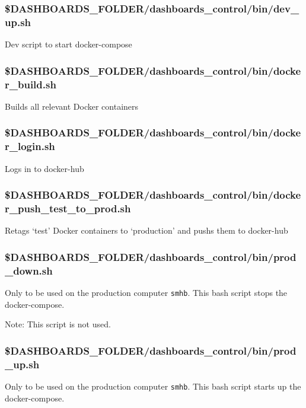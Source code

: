 \documentclass[12pt,]{article}
\begin{document}
\subsubsection{\$DASHBOARDS\_FOLDER/dashboards\_control/bin/dev\_up.sh}\label{dashboards_folderdashboards_controlbindev_up.sh}

Dev script to start docker-compose

\subsubsection{\$DASHBOARDS\_FOLDER/dashboards\_control/bin/docker\_build.sh}\label{dashboards_folderdashboards_controlbindocker_build.sh}

Builds all relevant Docker containers

\subsubsection{\$DASHBOARDS\_FOLDER/dashboards\_control/bin/docker\_login.sh}\label{dashboards_folderdashboards_controlbindocker_login.sh}

Logs in to docker-hub

\subsubsection{\$DASHBOARDS\_FOLDER/dashboards\_control/bin/docker\_push\_test\_to\_prod.sh}\label{dashboards_folderdashboards_controlbindocker_push_test_to_prod.sh}

Retags `test' Docker containers to `production' and pushs them to
docker-hub

\subsubsection{\$DASHBOARDS\_FOLDER/dashboards\_control/bin/prod\_down.sh}\label{dashboards_folderdashboards_controlbinprod_down.sh}

Only to be used on the production computer \texttt{smhb}. This bash
script stops the docker-compose.

Note: This script is not used.

\subsubsection{\$DASHBOARDS\_FOLDER/dashboards\_control/bin/prod\_up.sh}\label{dashboards_folderdashboards_controlbinprod_up.sh}

Only to be used on the production computer \texttt{smhb}. This bash
script starts up the docker-compose.
\end{document}
